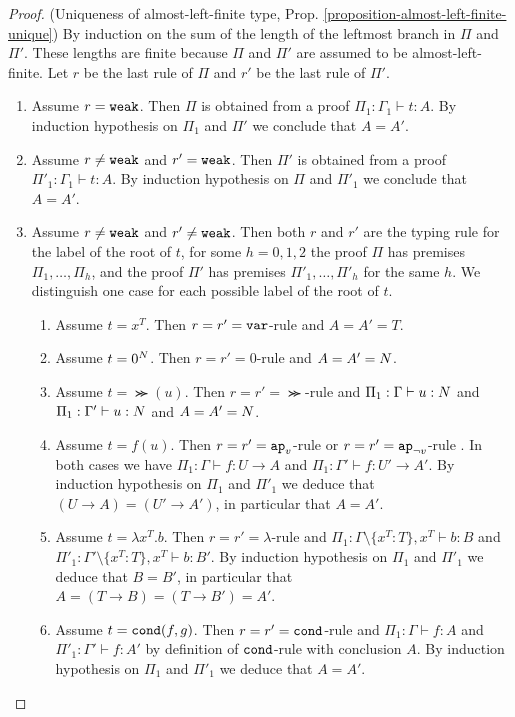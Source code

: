 \begin{proof}(Uniqueness of almost-left-finite type, Prop. \ref{proposition-almost-left-finite-unique})
By induction on the sum of the length of the leftmost branch in $\Pi$ and $\Pi'$. These lengths are finite
because $\Pi$ and $\Pi'$ are assumed to be almost-left-finite. Let $r$ be the last rule of $\Pi$ and $r'$ be the
last rule of $\Pi'$.
\begin{enumerate}
\item
Assume $r = {\tt weak}$. Then $\Pi$ is obtained from a proof $\Pi_1:\Gamma_1 \vdash t:A$. 
By induction hypothesis on $\Pi_1$ and $\Pi'$ we conclude that $A = A'$.

\item
Assume $r \not = {\tt weak}$ and $r' = {\tt weak}$. 
Then $\Pi'$ is obtained from a proof $\Pi'_1:\Gamma_1 \vdash t:A$. 
By induction hypothesis on $\Pi$ and $\Pi'_1$ we conclude that $A = A'$.

\item
Assume  $r \not = {\tt weak}$ and $r' \not = {\tt weak}$. Then both $r$ and $r'$ are the typing rule for the label of the root of $t$, for some
$h=0,1,2$ the proof $\Pi$ has premises $\Pi_1, \ldots, \Pi_h$,
and the proof $\Pi'$ has premises $\Pi'_1, \ldots, \Pi'_h$ for the same $h$. 
We distinguish one case for each possible label of the root of $t$.

\begin{enumerate}
\item
Assume $t = x^T$. Then $r=r'={\tt var}$-rule and $A = A' = T$.

\item
Assume $t =0^{N}$. Then $r=r'=0$-rule and $A = A' = {N}$.

\item
Assume $t =\Succ(u)$. Then $r=r'=\Succ$-rule  and $\Pi_1:\Gamma \vdash u: {N}$
and $\Pi_1:\Gamma' \vdash u:{N}$ and $A = A' = {N}$.

\item
Assume $t = f(u)$. Then $r=r'=\apvar$-rule or $r=r'=\apnotvar$-rule .
In both cases we have $\Pi_1:\Gamma \vdash f:U \rightarrow A$
and $\Pi_1:\Gamma' \vdash f:U' \rightarrow A'$. By induction hypothesis on 
$\Pi_1$ and $\Pi'_1$ we deduce that $(U \rightarrow A) = (U' \rightarrow A')$, 
in particular that $A = A'$.

\item
Assume $t = \lambda x^T.b$. Then $r=r'=\lambda$-rule and 
$\Pi_1:\Gamma\setminus\{x^T:T\}, x^T \vdash b:B$ and 
$\Pi'_1:\Gamma'\setminus\{x^T:T\}, x^T \vdash b:B'$. 
By induction hypothesis on $\Pi_1$ and $\Pi'_1$ we deduce that $B=B'$, in particular that $A = (T \rightarrow B) = (T \rightarrow B') = A'$.

\item
Assume $t = {\tt cond}(f,g)$. Then $r=r'={\tt cond}$-rule and $\Pi_1:\Gamma \vdash f:A$
and $\Pi'_1:\Gamma' \vdash f:A'$ by definition of ${\tt cond}$-rule with conclusion
$A$. By induction hypothesis on $\Pi_1$ and
$\Pi'_1$ we deduce that $A = A'$.

\end{enumerate}
\end{enumerate}
\end{proof}

